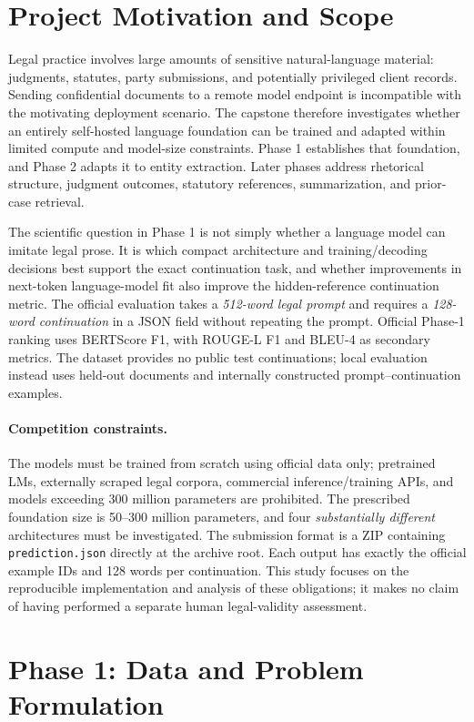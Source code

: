 \documentclass[11pt,a4paper]{article}
\newcommand{\method}[1]{\texttt{#1}}
\begin{document}
\section{Project Motivation and Scope}
Legal practice involves large amounts of sensitive natural-language material: judgments, statutes, party submissions, and potentially privileged client records. Sending confidential documents to a remote model endpoint is incompatible with the motivating deployment scenario. The capstone therefore investigates whether an entirely self-hosted language foundation can be trained and adapted within limited compute and model-size constraints. Phase 1 establishes that foundation, and Phase 2 adapts it to entity extraction. Later phases address rhetorical structure, judgment outcomes, statutory references, summarization, and prior-case retrieval.

The scientific question in Phase 1 is not simply whether a language model can imitate legal prose. It is which compact architecture and training/decoding decisions best support the exact continuation task, and whether improvements in next-token language-model fit also improve the hidden-reference continuation metric. The official evaluation takes a \emph{512-word legal prompt} and requires a \emph{128-word continuation} in a JSON field without repeating the prompt. Official Phase-1 ranking uses BERTScore F1, with ROUGE-L F1 and BLEU-4 as secondary metrics. The dataset provides no public test continuations; local evaluation instead uses held-out documents and internally constructed prompt--continuation examples.

\paragraph{Competition constraints.} The models must be trained from scratch using official data only; pretrained LMs, externally scraped legal corpora, commercial inference/training APIs, and models exceeding 300 million parameters are prohibited. The prescribed foundation size is 50--300 million parameters, and four \emph{substantially different} architectures must be investigated. The submission format is a ZIP containing \method{prediction.json} directly at the archive root. Each output has exactly the official example IDs and 128 words per continuation. This study focuses on the reproducible implementation and analysis of these obligations; it makes no claim of having performed a separate human legal-validity assessment.

\section{Phase 1: Data and Problem Formulation}
\end{document}
